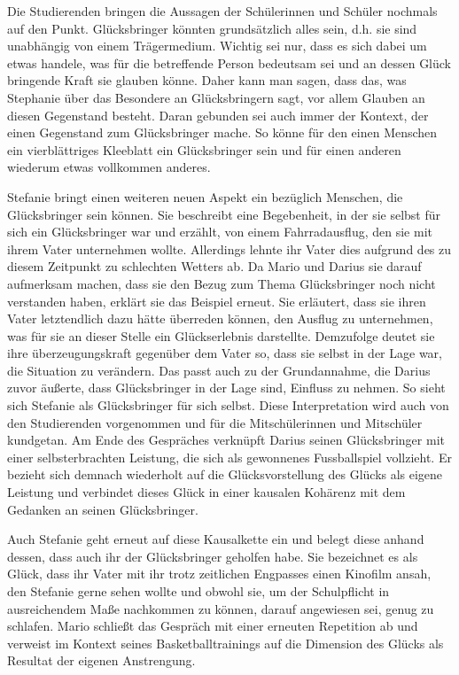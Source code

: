 Die Studierenden bringen die Aussagen der Schülerinnen und Schüler nochmals auf den Punkt. 
Glücksbringer könnten grundsätzlich alles sein, d.h. sie sind unabhängig von einem Trägermedium. 
Wichtig sei nur, dass es sich dabei um etwas handele, was für die betreffende Person bedeutsam sei und an dessen Glück bringende Kraft sie glauben könne. 
Daher kann man sagen, dass das, was Stephanie über das Besondere an Glücksbringern sagt, vor allem Glauben an diesen Gegenstand besteht.
Daran gebunden sei auch immer der Kontext, der einen Gegenstand zum Glücksbringer mache. 
So könne für den einen Menschen ein vierblättriges Kleeblatt ein Glücksbringer sein und für einen anderen wiederum etwas vollkommen anderes.

Stefanie bringt einen weiteren neuen Aspekt ein bezüglich Menschen, die Glücksbringer sein können. 
Sie beschreibt eine Begebenheit, in der sie selbst für sich ein Glücksbringer war und erzählt, von einem Fahrradausflug, den sie mit ihrem Vater unternehmen wollte.
Allerdings lehnte ihr Vater dies aufgrund des zu diesem Zeitpunkt zu schlechten Wetters ab. 
Da Mario und Darius sie darauf aufmerksam machen, dass sie den Bezug zum Thema \glqq Glücksbringer\grqq{} noch nicht verstanden haben, erklärt sie das Beispiel erneut. 
Sie erläutert, dass sie ihren Vater letztendlich dazu hätte überreden können, den Ausflug zu unternehmen, was für sie an dieser Stelle ein Glückserlebnis darstellte. 
Demzufolge deutet sie ihre überzeugungskraft gegenüber dem Vater so, dass sie selbst in der Lage war, die Situation zu verändern. 
Das passt auch zu der Grundannahme, die Darius zuvor äußerte, dass Glücksbringer in der Lage sind, Einfluss zu nehmen. 
So sieht sich Stefanie als Glücksbringer für sich selbst. 
Diese Interpretation wird auch von den Studierenden vorgenommen und für die Mitschülerinnen und Mitschüler kundgetan.
Am Ende des Gespräches verknüpft Darius seinen Glücksbringer mit einer selbsterbrachten Leistung, die sich als gewonnenes Fussballspiel vollzieht. 
Er bezieht sich demnach wiederholt auf die Glücksvorstellung des Glücks als eigene Leistung und verbindet dieses Glück in einer kausalen Kohärenz mit dem Gedanken an seinen Glücksbringer.

Auch Stefanie geht erneut auf diese Kausalkette ein und belegt diese anhand dessen, dass auch ihr der Glücksbringer geholfen habe. 
Sie bezeichnet es als Glück, dass ihr Vater mit ihr trotz zeitlichen Engpasses einen Kinofilm ansah, den Stefanie gerne sehen wollte und obwohl sie, um der Schulpflicht in ausreichendem Maße nachkommen zu können, darauf angewiesen sei, genug zu schlafen. Mario schließt das Gespräch mit einer erneuten Repetition ab und verweist im Kontext seines Basketballtrainings auf die Dimension des Glücks als Resultat der eigenen Anstrengung.

